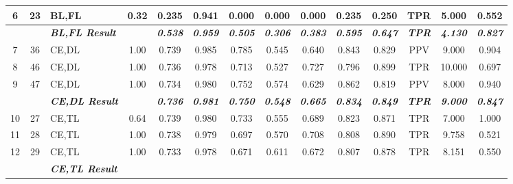 \begin{table}[H]
{\begin{tabular}{cc|l|c|c|c|c|c|c|c|c|c|c|c|}
  \multicolumn{1}{|c|}{6} &
    23 &
    BL,FL &
    0.32 &
    0.235 &
    0.941 &
    0.000 &
    0.000 &
    0.000 &
    0.235 &
    0.250 &
    TPR &
    5.000 &
    0.552 \\ \hline
  \textit{\textbf{}} &
    \textit{\textbf{}} &
    \textit{\textbf{BL,FL Result}} &
    \textit{\textbf{}} &
    \textit{\textbf{0.538}} &
    \textit{\textbf{0.959}} &
    \textit{\textbf{0.505}} &
    \textit{\textbf{0.306}} &
    \textit{\textbf{0.383}} &
    \textit{\textbf{0.595}} &
    \textit{\textbf{0.647}} &
    \textit{\textbf{TPR}} &
    \textit{\textbf{4.130}} &
    \textit{\textbf{0.827}} \\ \hline
  \multicolumn{1}{|c|}{7} &
    36 &
    CE,DL &
    1.00 &
    0.739 &
    0.985 &
    0.785 &
    0.545 &
    0.640 &
    0.843 &
    0.829 &
    PPV &
    9.000 &
    0.904 \\ \hline
  \multicolumn{1}{|c|}{8} &
    46 &
    CE,DL &
    1.00 &
    0.736 &
    0.978 &
    0.713 &
    0.527 &
    0.727 &
    0.796 &
    0.899 &
    TPR &
    10.000 &
    0.697 \\ \hline
  \multicolumn{1}{|c|}{9} &
    47 &
    CE,DL &
    1.00 &
    0.734 &
    0.980 &
    0.752 &
    0.574 &
    0.629 &
    0.862 &
    0.819 &
    PPV &
    8.000 &
    0.940 \\ \hline
  \textit{\textbf{}} &
    \textit{\textbf{}} &
    \textit{\textbf{CE,DL Result}} &
    \textit{\textbf{}} &
    \textit{\textbf{0.736}} &
    \textit{\textbf{0.981}} &
    \textit{\textbf{0.750}} &
    \textit{\textbf{0.548}} &
    \textit{\textbf{0.665}} &
    \textit{\textbf{0.834}} &
    \textit{\textbf{0.849}} &
    \textit{\textbf{TPR}} &
    \textit{\textbf{9.000}} &
    \textit{\textbf{0.847}} \\ \hline
  \multicolumn{1}{|c|}{10} &
    27 &
    CE,TL &
    0.64 &
    0.739 &
    0.980 &
    0.733 &
    0.555 &
    0.689 &
    0.823 &
    0.871 &
    TPR &
    7.000 &
    1.000 \\ \hline
  \multicolumn{1}{|c|}{11} &
    28 &
    CE,TL &
    1.00 &
    0.738 &
    0.979 &
    0.697 &
    0.570 &
    0.708 &
    0.808 &
    0.890 &
    TPR &
    9.758 &
    0.521 \\ \hline
  \multicolumn{1}{|c|}{12} &
    29 &
    CE,TL &
    1.00 &
    0.733 &
    0.978 &
    0.671 &
    0.611 &
    0.672 &
    0.807 &
    0.878 &
    TPR &
    8.151 &
    0.550 \\ \hline
  \textit{\textbf{}} &
    \textit{\textbf{}} &
    \textit{\textbf{CE,TL Result}} &
    \textit{\textbf{}} &

\end{tabular}}
\end{table}
